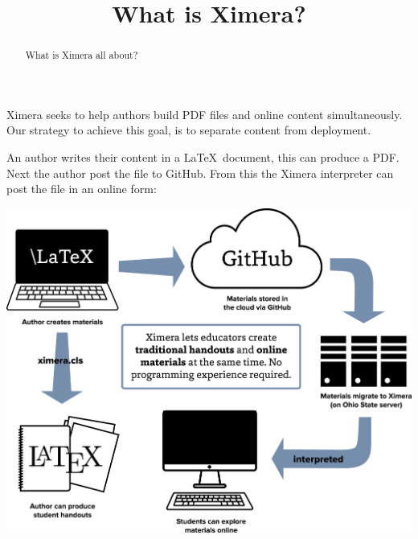 \documentclass{ximera}
\title{What is Ximera?}
\begin{document}
\begin{abstract}
What is Ximera all about?
\end{abstract}
\maketitle

Ximera seeks to help authors build PDF files and online content
simultaneously. Our strategy to achieve this goal, is to separate
content from deployment.


An author writes their content in a \LaTeX\ document, this can produce
a PDF. Next the author post the file to GitHub. From this the Ximera interpreter can post the file in an online form:


\begin{image}
\includegraphics{XimeraGraphic.png}
\end{image}
\end{document}

